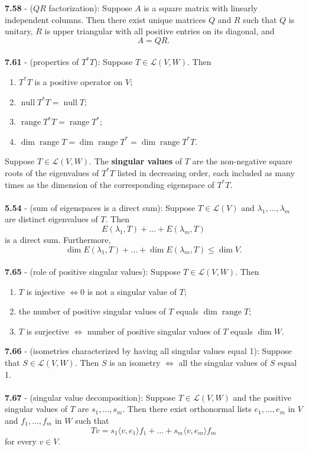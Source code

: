 \documentclass{article}
\DeclareMathOperator{\Null}{null}
\DeclareMathOperator{\Range}{range}
\DeclareMathOperator{\Dim}{dim}
\theoremstyle{definition}
\begin{document}
\textbf{7.58} - ($QR$ factorization): Suppose $A$ is a square matrix with linearly independent columns. Then there exist unique matrices $Q$ and $R$ such that $Q$ is unitary, $R$ is upper triangular with all positive entries on its diagonal, and $$A = QR.$$ \\
\textbf{7.61} - (properties of $T^*T$): Suppose $T \in \mathcal{L}(V, W)$. Then \begin{enumerate}
    \item $T^*T$ is a positive operator on $V$;
    \item $\Null{T^*T} = \Null{T}$;
    \item $\Range{T^*T} = \Range{T^*}$;
    \item $\Dim{\Range{T}} = \Dim{\Range{T^*}} = \Dim{\Range{T^*T}}$.
\end{enumerate} $ $ \\
Suppose $T \in \mathcal{L}(V, W)$. The \textbf{singular values} of $T$ are the non-negative square roots of the eigenvalues of $T^*T$ listed in decreasing order, each included as many times as the dimension of the corresponding eigenspace of $T^*T$. \\ \\
\textbf{5.54} - (sum of eigenspaces is a direct sum): Suppose $T \in \mathcal{L}(V)$ and $\lambda_1, \dots, \lambda_m$ are distinct eigenvalues of $T$. Then $$E(\lambda_1, T) + \dots + E(\lambda_m, T)$$ is a direct sum. Furthermore, $$\Dim{E(\lambda_1, T)} + \dots + \Dim{E(\lambda_m, T)} \leq \Dim{V}.$$ \\
\textbf{7.65} - (role of positive singular values): Suppose $T \in \mathcal{L}(V, W)$. Then \begin{enumerate}
    \item $T$ is injective $\iff 0$ is not a singular value of $T$;
    \item the number of positive singular values of $T$ equals $\Dim{\Range{T}}$;
    \item $T$ is surjective $\iff$ number of positive singular values of $T$ equals $\Dim{W}$.
\end{enumerate} $ $ \\
\textbf{7.66} - (isometries characterized by having all singular values equal 1): Suppose that $S \in \mathcal{L}(V, W)$. Then $S$ is an isometry $\iff$ all the singular values of $S$ equal 1. \\ \\
\textbf{7.67} - (singular value decomposition): Suppose $T \in \mathcal{L}(V, W)$ and the positive singular values of $T$ are $s_1, \dots, s_m$. Then there exist orthonormal lists $e_1, \dots, e_m$ in $V$ and $f_1, \dots, f_m$ in $W$ such that $$Tv = s_1 \langle v, e_1 \rangle f_1 + \dots + s_m \langle v, e_m \rangle f_m$$ for every $v \in V$. \\ \\
\end{document}
